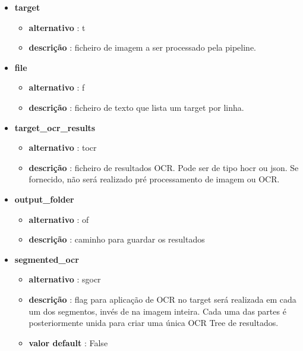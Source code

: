\begin{itemize}\setlength\itemsep{-0.8em}
	\item \textbf{target} 
		\begin{itemize}\setlength\itemsep{-0.5em}
			\vspace{-1em}
			\item \textbf{alternativo} : t
			\item \textbf{descrição} : ficheiro de imagem a ser processado pela pipeline.
		\end{itemize}
		
	\item \textbf{file}
		\begin{itemize}\setlength\itemsep{-0.5em}
			\vspace{-1em}
			\item \textbf{alternativo} : f
			\item \textbf{descrição} : ficheiro de texto que lista um target por linha.
		\end{itemize}
		
	\item \textbf{target\_ocr\_results} 
		\begin{itemize}\setlength\itemsep{-0.5em}
			\vspace{-1em}
			\item \textbf{alternativo} : tocr
			\item \textbf{descrição} : ficheiro de resultados OCR. Pode ser de tipo hocr ou json. Se fornecido, não será realizado pré processamento de imagem ou OCR.
		\end{itemize}
		
	\item \textbf{output\_folder}
		\begin{itemize}\setlength\itemsep{-0.5em}
			\vspace{-1em}
			\item \textbf{alternativo} : of
			\item \textbf{descrição} : caminho para guardar os resultados
		\end{itemize}
		
	
	\item \textbf{segmented\_ocr}
		\begin{itemize}\setlength\itemsep{-0.5em}
			\vspace{-1em}
			\item \textbf{alternativo} : sgocr
			\item \textbf{descrição} : flag para aplicação de OCR no target será realizada em cada um dos segmentos, invés de na imagem inteira. Cada uma das partes é posteriormente unida para criar uma única OCR Tree de resultados.
			\item \textbf{valor default} : False
		\end{itemize}
		

\end{itemize}

